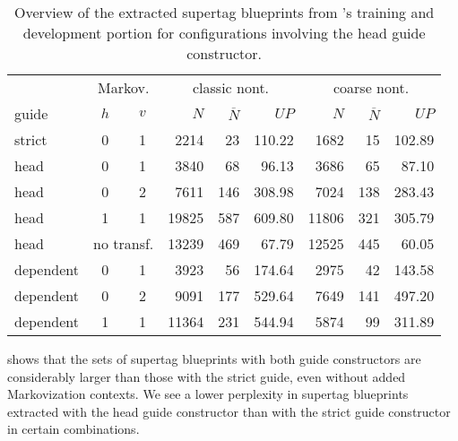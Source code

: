\documentclass[../../document.tex]{subfiles}
\begin{document}
    \begin{table}
        \caption{\label{tbl:gridsearch:head:1}
        Overview of the extracted supertag blueprints from \negra{}'s training and development portion for configurations involving the head guide constructor.
        }
        \centering
        \vspace{.2cm}
        \begin{tabular}{lcc|rrr|rrr}
            \toprule
            & \multicolumn{2}{c|}{Markov.} & \multicolumn{3}{c|}{classic nont.} &  \multicolumn{3}{c}{coarse nont.} \\
guide      & \(h\) & \(v\) & $N$ & $\overline{N}$ & $\mathit{UP}$ & $N$ & $\overline{N}$ & $\mathit{UP}$  \\ \hline \rowcolor{black!10}
strict     & 0 & 1 & 2214 & 23 & 110.22 & 1682 & 15 & 102.89 \\\hline
head & 0 & 1 & 3840 & 68 & 96.13 & 3686 & 65 & 87.10 \\
head & 0 & 2 & 7611 & 146 & 308.98 & 7024 & 138 & 283.43 \\
head & 1 & 1 & 19825 & 587 & 609.80 & 11806 & 321 & 305.79 \\
head & \multicolumn{2}{c|}{no transf.}  & 13239 & 469 & 67.79 & 12525 & 445 & 60.05 \\ \hline
dependent & 0 & 1 & 3923 & 56 & 174.64 & 2975 & 42 & 143.58 \\
dependent & 0 & 2 & 9091 & 177 & 529.64 & 7649 & 141 & 497.20 \\
dependent & 1 & 1 & 11364 & 231 & 544.94 & 5874 & 99 & 311.89 \\
\bottomrule
        \end{tabular}
    \end{table}

     shows that the sets of supertag blueprints with both guide constructors are considerably larger than those with the strict guide, even without added Markovization contexts.
    We see a lower perplexity in supertag blueprints extracted with the head guide constructor than with the strict guide constructor in certain combinations.
\end{document}
